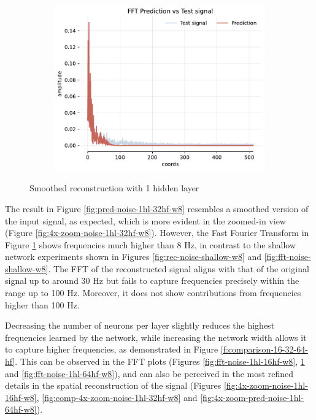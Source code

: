 \begin{figure}[h]
    \begin{subfigure}[b]{0.32\textwidth}
        \centering
        \includegraphics[width=\textwidth]{img/ch3/fft-noise-1hl-32hf-w8.pdf}
        \caption{}
        \label{fig:fft-noise-1hl-32hf-w8}
    \end{subfigure}
    \caption{Smoothed reconstruction with 1 hidden layer}
    \label{f:rec-1hl-32hf-8hz}
\end{figure}

The result in Figure \ref{fig:pred-noise-1hl-32hf-w8} resembles a smoothed version of the input signal, as expected, which is more evident in the zoomed-in view (Figure \ref{fig:4x-zoom-noise-1hl-32hf-w8}). However, the Fast Fourier Transform in Figure \ref{fig:fft-noise-1hl-32hf-w8} shows frequencies much higher than 8 Hz, in contrast to the shallow network experiments shown in Figures \ref{fig:rec-noise-shallow-w8} and \ref{fig:fft-noise-shallow-w8}. The FFT of the reconstructed signal aligns with that of the original signal up to around 30 Hz but fails to capture frequencies precisely within the range up to 100 Hz. Moreover, it does not show contributions from frequencies higher than 100 Hz.

Decreasing the number of neurons per layer slightly reduces the highest frequencies learned by the network, while increasing the network width allows it to capture higher frequencies, as demonstrated in Figure \ref{f:comparison-16-32-64-hf}. This can be observed in the FFT plots (Figures \ref{fig:fft-noise-1hl-16hf-w8}, \ref{fig:fft-noise-1hl-32hf-w8} and \ref{fig:fft-noise-1hl-64hf-w8}), and can also be perceived in the most refined details in the spatial reconstruction of the signal (Figures \ref{fig:4x-zoom-noise-1hl-16hf-w8}, \ref{fig:comp-4x-zoom-noise-1hl-32hf-w8} and \ref{fig:4x-zoom-pred-noise-1hl-64hf-w8}).

